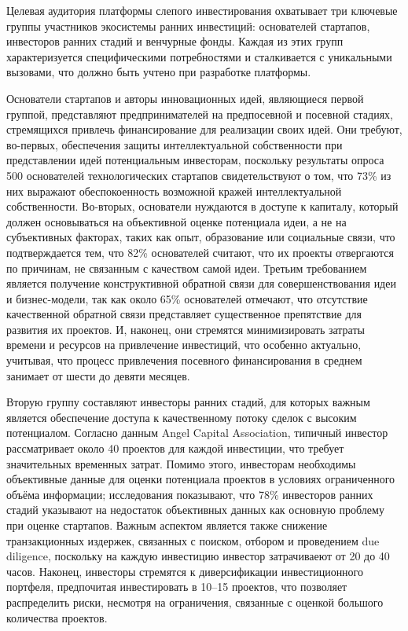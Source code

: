 \documentclass[
    candidate, %
    subf, %
    dotsinheaders=false,
]{disser}
\begin{document}
Целевая аудитория платформы слепого инвестирования охватывает три ключевые группы участников экосистемы ранних инвестиций: основателей стартапов, инвесторов ранних стадий и венчурные фонды. Каждая из этих групп характеризуется специфическими потребностями и сталкивается с уникальными вызовами, что должно быть учтено при разработке платформы.

Основатели стартапов и авторы инновационных идей, являющиеся первой группой, представляют предпринимателей на предпосевной и посевной стадиях, стремящихся привлечь финансирование для реализации своих идей. Они требуют, во-первых, обеспечения защиты интеллектуальной собственности при представлении идей потенциальным инвесторам, поскольку результаты опроса 500 основателей технологических стартапов свидетельствуют о том, что 73\% из них выражают обеспокоенность возможной кражей интеллектуальной собственности. Во-вторых, основатели нуждаются в доступе к капиталу, который должен основываться на объективной оценке потенциала идеи, а не на субъективных факторах, таких как опыт, образование или социальные связи, что подтверждается тем, что 82\% основателей считают, что их проекты отвергаются по причинам, не связанным с качеством самой идеи. Третьим требованием является получение конструктивной обратной связи для совершенствования идеи и бизнес-модели, так как около 65\% основателей отмечают, что отсутствие качественной обратной связи представляет существенное препятствие для развития их проектов. И, наконец, они стремятся минимизировать затраты времени и ресурсов на привлечение инвестиций, что особенно актуально, учитывая, что процесс привлечения посевного финансирования в среднем занимает от шести до девяти месяцев.

Вторую группу составляют инвесторы ранних стадий, для которых важным является обеспечение доступа к качественному потоку сделок с высоким потенциалом. Согласно данным Angel Capital Association, типичный инвестор рассматривает около 40 проектов для каждой инвестиции, что требует значительных временных затрат. Помимо этого, инвесторам необходимы объективные данные для оценки потенциала проектов в условиях ограниченного объёма информации; исследования показывают, что 78\% инвесторов ранних стадий указывают на недостаток объективных данных как основную проблему при оценке стартапов. Важным аспектом является также снижение транзакционных издержек, связанных с поиском, отбором и проведением due diligence, поскольку на каждую инвестицию инвестор затрачиваеют от 20 до 40 часов. Наконец, инвесторы стремятся к диверсификации инвестиционного портфеля, предпочитая инвестировать в 10–15 проектов, что позволяет распределить риски, несмотря на ограничения, связанные с оценкой большого количества проектов.
\end{document}
